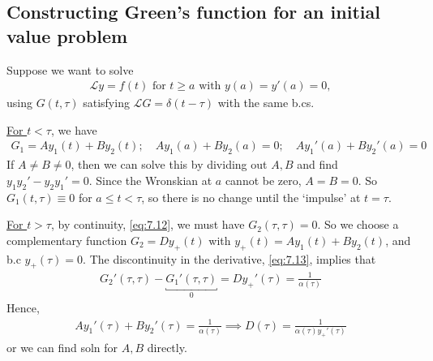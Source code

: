 \subsection{Constructing Green's function for an initial value problem}
Suppose we want to solve 
\begin{align} \label{eq:7.24}
	\mathcal L y = f(t) \text{ for } t \geq a \text{ with } y(a) = y'(a) = 0,
\end{align}
using $G(t, \tau)$ satisfying $\mathcal L G = \delta(t - \tau)$ with the same b.cs.

\underline{For $t < \tau$}, we have
\begin{align*}
	G_1 = A y_1(t) + B y_2(t);\quad A y_1(a) + B y_2(a) = 0;\quad A y_1'(a) + B y_2'(a) = 0
\end{align*}
If $A \neq B \neq 0$, then we can solve this by dividing out $A, B$ and find $y_1 y_2' - y_2 y_1' = 0$.
Since the Wronskian at $a$ cannot be zero, $A = B = 0$.
So $G_1(t,\tau) \equiv 0$ for $a \leq t < \tau$, so there is no change until the `impulse' at $t = \tau$.

\underline{For $t > \tau$}, by continuity, \cref{eq:7.12}, we must have $G_2(\tau, \tau) = 0$.
So we choose a complementary function $G_2 = D y_+(t)$ with $y_+(t) = A y_1(t) + B y_2(t)$, and b.c $y_+(\tau) = 0$.
The discontinuity in the derivative, \cref{eq:7.13}, implies that
\begin{align*}
	G_2'(\tau, \tau) - \underbracket{G_1'(\tau, \tau)}_0 = Dy_+'(\tau) = \frac{1}{\alpha(\tau)}
\end{align*}
Hence,
\begin{align*}
	A y_1'(\tau) + B y_2'(\tau) = \frac{1}{\alpha(\tau)} \implies D(\tau) = \frac{1}{\alpha(\tau) y_+'(\tau)}
\end{align*}
or we can find soln for $A, B$ directly.

